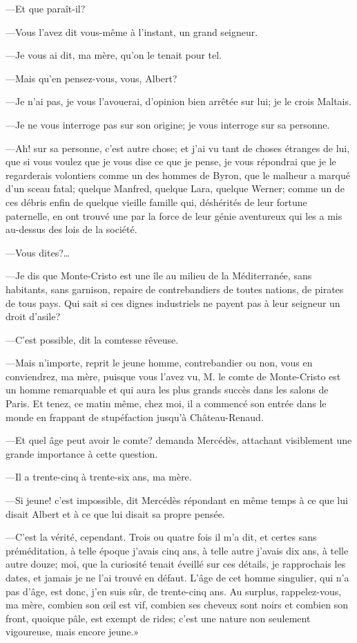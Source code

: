 —Et que paraît-il? 

—Vous l'avez dit vous-même à l'instant, un grand seigneur. 

—Je vous ai dit, ma mère, qu'on le tenait pour tel. 

—Mais qu'en pensez-vous, vous, Albert? 

—Je n'ai pas, je vous l'avouerai, d'opinion bien arrêtée sur lui; je le crois Maltais. 

—Je ne vous interroge pas sur son origine; je vous interroge sur sa personne. 

—Ah! sur sa personne, c'est autre chose; et j'ai vu tant de choses étranges de lui, que si vous voulez que je vous dise ce que je pense, je vous répondrai que je le regarderais volontiers comme un des hommes de Byron, que le malheur a marqué d'un sceau fatal; quelque Manfred, quelque Lara, quelque Werner; comme un de ces débris enfin de quelque vieille famille qui, déshérités de leur fortune paternelle, en ont trouvé une par la force de leur génie aventureux qui les a mis au-dessus des lois de la société. 

—Vous dites?\dots 

—Je dis que Monte-Cristo est une île au milieu de la Méditerranée, sans habitants, sans garnison, repaire de contrebandiers de toutes nations, de pirates de tous pays. Qui sait si ces dignes industriels ne payent pas à leur seigneur un droit d'asile? 

—C'est possible, dit la comtesse rêveuse. 

—Mais n'importe, reprit le jeune homme, contrebandier ou non, vous en conviendrez, ma mère, puisque vous l'avez vu, M. le comte de Monte-Cristo est un homme remarquable et qui aura les plus grands succès dans les salons de Paris. Et tenez, ce matin même, chez moi, il a commencé son entrée dans le monde en frappant de stupéfaction jusqu'à Château-Renaud. 

—Et quel âge peut avoir le comte? demanda Mercédès, attachant visiblement une grande importance à cette question. 

—Il a trente-cinq à trente-six ans, ma mère. 

—Si jeune! c'est impossible, dit Mercédès répondant en même temps à ce que lui disait Albert et à ce que lui disait sa propre pensée. 

—C'est la vérité, cependant. Trois ou quatre fois il m'a dit, et certes sans préméditation, à telle époque j'avais cinq ans, à telle autre j'avais dix ans, à telle autre douze; moi, que la curiosité tenait éveillé sur ces détails, je rapprochais les dates, et jamais je ne l'ai trouvé en défaut. L'âge de cet homme singulier, qui n'a pas d'âge, est donc, j'en suis sûr, de trente-cinq ans. Au surplus, rappelez-vous, ma mère, combien son œil est vif, combien ses cheveux sont noirs et combien son front, quoique pâle, est exempt de rides; c'est une nature non seulement vigoureuse, mais encore jeune.» 

